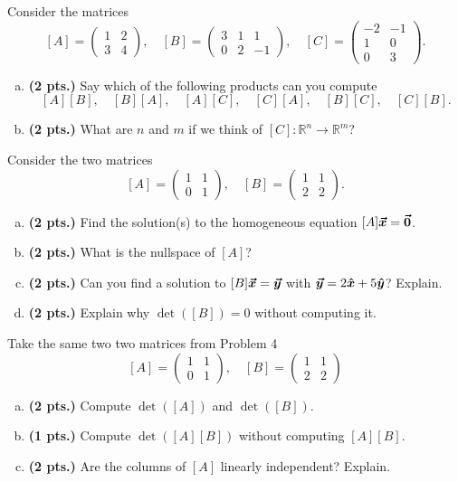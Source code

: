 \documentclass[12pt]{amsbook}
\newcommand{\R}{\mathbb{R}}
\begin{document}
\begin{problem}
Consider the matrices
\[
[A] = \begin{pmatrix} 1 & 2 \\ 3 & 4 \end{pmatrix}, \quad [B] = \begin{pmatrix} 3 & 1 & 1 \\ 0 & 2 & -1 \end{pmatrix}, \quad [C] = \begin{pmatrix} -2 & -1 \\ 1 & 0 \\ 0 & 3 \end{pmatrix}.
\]
\begin{enumerate}[(a)]
    \item \textbf{(2 pts.)} Say which of the following products can you compute
    \[
    [A][B],\quad [B][A], \quad [A][C], \quad [C][A], \quad [B][C], \quad [C][B].
    \]
    \item \textbf{(2 pts.)} What are $n$ and $m$ if we think of $[C] \colon \R^n \to \R^m$?
\end{enumerate}
\end{problem}


\begin{problem}
Consider the two matrices 
\[
[A] = \begin{pmatrix} 1 & 1 \\ 0 & 1 \end{pmatrix}, \quad [B] = \begin{pmatrix} 1 & 1 \\ 2 & 2 \end{pmatrix}.
\]
\begin{enumerate}[(a)]
    \item \textbf{(2 pts.)} Find the solution(s) to the homogeneous equation $[A]\boldsymbol{\boldsymbol{\vec{x}}} = \boldsymbol{\vec{0}}$.
    \item \textbf{(2 pts.)} What is the nullspace of $[A]$?
    \item \textbf{(2 pts.)} Can you find a solution to $[B]\boldsymbol{\boldsymbol{\vec{x}}} = \boldsymbol{\boldsymbol{\vec{y}}}$ with $\boldsymbol{\boldsymbol{\vec{y}}} = 2\boldsymbol{\hat{x}} +5\boldsymbol{\hat{y}}$? Explain.
    \item \textbf{(2 pts.)} Explain why $\det([B])=0$ without computing it.
\end{enumerate}
\end{problem}


\begin{problem}
Take the same two two matrices from Problem 4
\[
[A] = \begin{pmatrix} 1 & 1 \\ 0 & 1 \end{pmatrix}, \quad [B] = \begin{pmatrix} 1 & 1 \\ 2 & 2 \end{pmatrix}
\]
\begin{enumerate}[(a)]
    \item \textbf{(2 pts.)} Compute $\det([A])$ and $\det([B])$.
    \item \textbf{(1 pts.)} Compute $\det([A][B])$ without computing $[A][B]$.
    \item \textbf{(2 pts.)} Are the columns of $[A]$ linearly independent? Explain.
\end{enumerate}
\end{problem}
\end{document}
